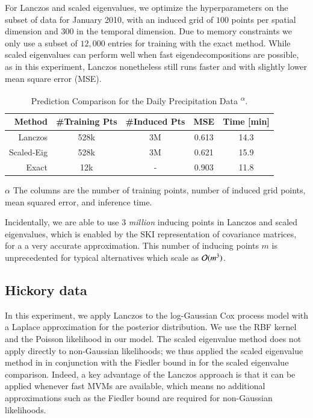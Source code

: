For Lanczos and scaled eigenvalues, we optimize the hyperparameters on the
subset of data for January 2010, with an induced grid of $100$ points per
spatial dimension and $300$ in the temporal dimension. Due to memory constraints
we only use a subset of $12,000$ entries for training with the exact method.
%
While scaled eigenvalues can perform well when fast eigendecompositions are
possible, as in this experiment, Lanczos nonetheless still runs faster and with
slightly lower mean square error (MSE).

\begin{table}[ht]
  \centering
  \caption{Prediction Comparison for the Daily Precipitation Data
  \textsuperscript{$\alpha$}.}\label{tab:precip}
  \begin{threeparttable}
    \begin{tabular}{r c c c c}
      \toprule
      Method  & \#Training Pts   & \#Induced Pts & MSE & Time [min]\\ \midrule
      Lanczos & 528k  & 3M  & 0.613 &  14.3\\
      Scaled\hyp{}Eig & 528k  & 3M  & 0.621 &  15.9\\
      Exact   & 12k   & -   & 0.903 &  11.8\\
      \bottomrule
    \end{tabular}
    \begin{tablenotes}
      \item[$\alpha$] The columns are the number of training points, number of
      induced grid points, mean squared error, and inference time.
    \end{tablenotes}
  \end{threeparttable}
\end{table}
Incidentally, we are able to use 3 \emph{million} inducing points in Lanczos and
scaled eigenvalues, which is enabled by the SKI representation 
\citep{wilson2015kernel} of covariance matrices, for a a very accurate
approximation.  This number of inducing points $m$ is unprecedented for typical
alternatives which scale as $\mathcal{O}(m^3)$.


\subsection{Hickory data}
In this experiment, we apply Lanczos to the log-Gaussian Cox process model with
a Laplace approximation for the posterior distribution. We use the RBF kernel
and the Poisson likelihood in our model.  The scaled eigenvalue method does not
apply directly to non-Gaussian likelihoods; we thus applied the scaled
eigenvalue method in \citep{wilson2015kernel} in conjunction with the Fiedler
bound in \citep{flaxman2015fast} for the scaled eigenvalue comparison.  Indeed,
a key advantage of the Lanczos approach is that it can be applied whenever fast
MVMs are available, which means no additional approximations such as the Fiedler
bound are required for non-Gaussian likelihoods.

